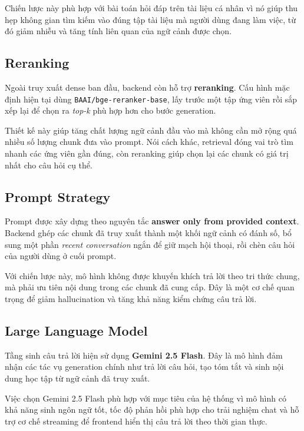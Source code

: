 \documentclass[12pt]{ai_conquer2026}
\begin{document}
Chiến lược này phù hợp với bài toán hỏi đáp trên tài liệu cá nhân vì nó giúp thu hẹp không gian tìm kiếm vào đúng tập tài liệu mà người dùng đang làm việc, từ đó giảm nhiễu và tăng tính liên quan của ngữ cảnh được chọn.

\subsection{Reranking}

Ngoài truy xuất dense ban đầu, backend còn hỗ trợ \textbf{reranking}. Cấu hình mặc định hiện tại dùng \texttt{BAAI/bge-reranker-base}, lấy trước một tập ứng viên rồi sắp xếp lại để chọn ra \textit{top-k} phù hợp hơn cho bước generation.

Thiết kế này giúp tăng chất lượng ngữ cảnh đầu vào mà không cần mở rộng quá nhiều số lượng chunk đưa vào prompt. Nói cách khác, retrieval đóng vai trò tìm nhanh các ứng viên gần đúng, còn reranking giúp chọn lại các chunk có giá trị nhất cho câu hỏi cụ thể.

\subsection{Prompt Strategy}

Prompt được xây dựng theo nguyên tắc \textbf{answer only from provided context}. Backend ghép các chunk đã truy xuất thành một khối ngữ cảnh có đánh số, bổ sung một phần \textit{recent conversation} ngắn để giữ mạch hội thoại, rồi chèn câu hỏi của người dùng ở cuối prompt.

Với chiến lược này, mô hình không được khuyến khích trả lời theo tri thức chung, mà phải ưu tiên nội dung trong các chunk đã cung cấp. Đây là một cơ chế quan trọng để giảm hallucination và tăng khả năng kiểm chứng câu trả lời.

\subsection{Large Language Model}

Tầng sinh câu trả lời hiện sử dụng \textbf{Gemini 2.5 Flash}. Đây là mô hình đảm nhận các tác vụ generation chính như trả lời câu hỏi, tạo tóm tắt và sinh nội dung học tập từ ngữ cảnh đã truy xuất.

Việc chọn Gemini 2.5 Flash phù hợp với mục tiêu của hệ thống vì mô hình có khả năng sinh ngôn ngữ tốt, tốc độ phản hồi phù hợp cho trải nghiệm chat và hỗ trợ cơ chế streaming để frontend hiển thị câu trả lời theo thời gian thực.
\end{document}
